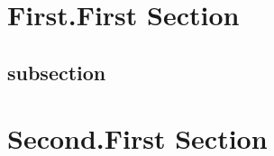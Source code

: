 \documentclass[11pt,twoside]{tubsartcl}
\begin{document}
\makeatletter
\makeatother

\fbox{\tubslatexVersion}\par
\sloppy
\lipsum[1]
\section{First.First Section}
\subsection{subsection}
\lipsum[2-25]
\lipsum[26]
\section{Second.First Section}
\lipsum[27-40]
\end{document}
